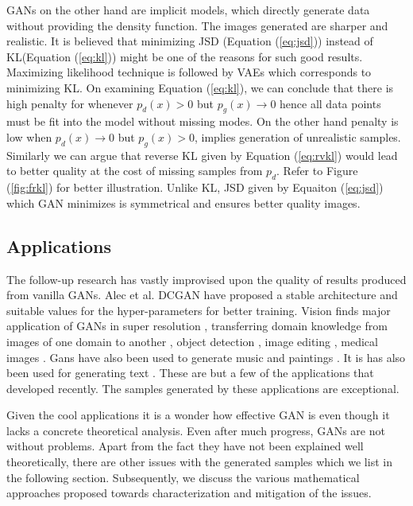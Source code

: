 GANs on the other hand are implicit models, which directly generate data without providing the density function. The images generated are sharper and realistic. It is believed that minimizing JSD (Equation (\ref{eq:jsd})) instead of KL(Equation (\ref{eq:kl})) might be one of the reasons for such good results. Maximizing likelihood technique is followed by VAEs which corresponds to minimizing KL. On examining Equation (\ref{eq:kl}), we can conclude that there is high penalty for whenever $p_d(x) > 0$ but $p_g(x) \rightarrow 0$  hence all data points must be fit into the model without missing modes. On the other hand penalty is low when $p_d(x) \rightarrow 0$ but $p_g(x) > 0$, implies generation of unrealistic samples. Similarly we can argue that reverse KL given by Equation (\ref{eq:rvkl}) would lead to better quality at the cost of missing samples from $p_d$. Refer to Figure (\ref{fig:frkl}) for better illustration. Unlike KL, JSD given by Equaiton (\ref{eq:jsd}) which GAN minimizes is symmetrical and ensures better quality images.


\subsection{Applications}
The follow-up research has vastly improvised upon the quality of results produced from vanilla GANs. Alec et al. DCGAN \citep{dcgan} have proposed a stable architecture and suitable values for the hyper-parameters for better training. Vision finds major application of GANs in super resolution \citep{progressive,srgan}, transferring domain knowledge from images of one domain to another \citep{cyclegan, discogan, pixeldtgan, pix2pix}, object detection \citep{perceptual}, image editing \citep{imageblend}, medical images \citep{anomaly}. Gans have also been used to generate music \citep{musegan} and paintings \citep{paint}. It is has also been used for generating text \citep{seqgan, relgan, advnl}. These are but a few of the applications that developed recently. The samples generated by these applications are exceptional.

Given the cool applications it is a wonder how effective GAN is even though it lacks a concrete theoretical analysis. Even after much progress, GANs are not without problems. Apart from the fact they have not been explained well theoretically, there are other issues with the generated samples which we list in the following section. Subsequently, we discuss the various mathematical approaches proposed towards characterization and mitigation of the issues.


